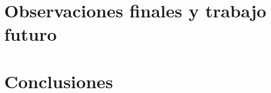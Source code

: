 \documentclass{llncs}
\begin{document}
\section{Observaciones finales y trabajo futuro}
\label{obsytrabfuturo}

\section{Conclusiones}
\label{conclusiones}




\end{document}
